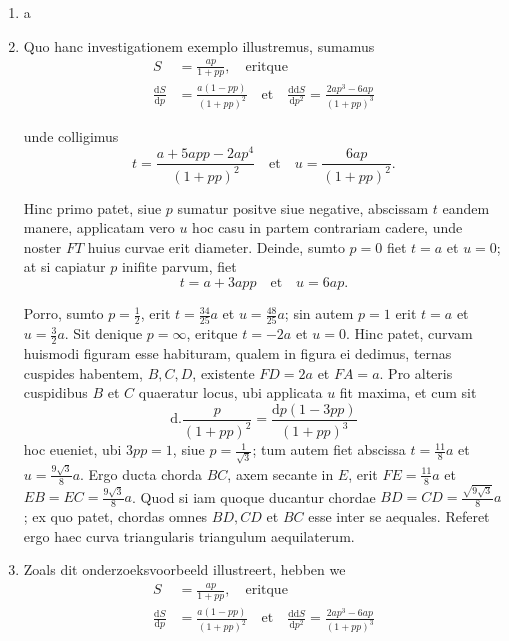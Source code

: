 \documentclass[10pt,a4paper]{article}
\newcommand{\switchenum}{\setcounter{enumi}{\arabic{enumi}-1}\switchcolumn}
\def\D{\mathrm{d}}
\begin{document}
\begin{paracol}{2}
\begin{enumerate}[topsep=1px]
		\switchenum
		\item a
		\switchcolumn*
		
		\item Quo hanc investigationem exemplo illustremus, sumamus
		\begin{align*}
			S &= \frac{ap}{1+pp}, \quad\text{eritque}\\
			\frac{\D S}{\D p} &= \frac{a(1-pp)}{(1+pp)^2} \quad \text{et} \quad \frac{\D \D S}{\D p^2} = \frac{2ap^3-6ap}{(1+pp)^3}
		\end{align*}

		unde colligimus
		\[
			t = \frac{a+5app-2ap^4}{(1+pp)^2}\quad \text{et} \quad u = \frac{6ap}{(1+pp)^2}.
		\]
		\par Hinc primo patet, siue $p$ sumatur positve siue negative, abscissam $t$ eandem manere, applicatam vero $u$ hoc casu in partem contrariam cadere, unde noster $FT$ huius curvae erit diameter. Deinde, sumto $p=0$ fiet $t=a$ et $u=0$; at si capiatur $p$ inifite parvum, fiet
		\[
			t = a + 3app\quad \text{et} \quad u= 6ap.
		\]
		\par Porro, sumto $p=\frac{1}{2}$, erit $t=\frac{34}{25}a$ et $u=\frac{48}{25}a$; sin autem $p=1$ erit $t=a$ et $u=\frac{3}{2}a$. Sit denique $p=\infty$, eritque $t=-2a$ et $u=0$. Hinc patet, curvam huismodi figuram esse habituram, qualem in figura ei dedimus, ternas cuspides habentem, $B,C,D$, existente $FD=2a$ et $FA=a$. Pro alteris cuspidibus $B$ et $C$ quaeratur locus, ubi applicata $u$ fit maxima, et cum sit
		\[
			\D.\frac{p}{(1+pp)^2} = \frac{\D p(1-3pp)}{(1+pp)^3}
		\]
		hoc eueniet, ubi $3pp=1$, siue $p=\frac{1}{\sqrt{3}}$; tum autem fiet abscissa $t=\frac{11}{8}a$ et $u=\frac{9\sqrt{3}}{8}a$. Ergo ducta chorda $BC$, axem secante in $E$, erit $FE= \frac{11}{8}a$ et $EB=EC=\frac{9\sqrt{3}}{8}a$. Quod si iam quoque ducantur chordae $BD=CD = \frac{\sqrt{9\sqrt{3}}}{8}a$; ex quo patet, chordas omnes $BD, CD$ et $BC$ esse inter se aequales. Referet ergo haec curva triangularis triangulum aequilaterum.
		
		\switchenum
		\item Zoals dit onderzoeksvoorbeeld illustreert, hebben we
		\begin{align*}
			S &= \frac{ap}{1+pp}, \quad\text{eritque}\\
			\frac{\D S}{\D p} &= \frac{a(1-pp)}{(1+pp)^2} \quad \text{et} \quad \frac{\D \D S}{\D p^2} = \frac{2ap^3-6ap}{(1+pp)^3}
		\end{align*}


\end{enumerate}
\end{paracol}
\end{document}
